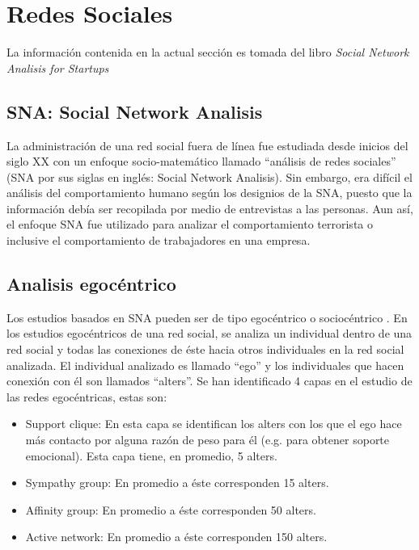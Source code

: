 \section{Redes Sociales} \label{sec:red}

La información contenida en la actual sección es tomada del libro \textit{Social Network Analisis for Startups} \cite{sna_startups}

\subsection{SNA: Social Network Analisis}

La administración de una red social fuera de línea fue estudiada desde inicios del siglo XX \cite{dynamics} con un enfoque socio-matemático llamado “análisis de redes sociales” (SNA por sus siglas en inglés: Social Network Analisis). Sin embargo, era difícil el análisis del comportamiento humano según los designios de la SNA, puesto que la información debía ser recopilada por medio de entrevistas a las personas. Aun así, el enfoque SNA fue utilizado para analizar el comportamiento terrorista o inclusive el comportamiento de trabajadores en una empresa. \cite{sna_startups}

\subsection{Analisis egocéntrico} \label{sec:egocentrico}

Los estudios basados en SNA pueden ser de tipo egocéntrico o sociocéntrico \cite{user_behavior}. En los estudios egocéntricos de una red social, se analiza un individual dentro de una red social y todas las conexiones de éste hacia otros individuales en la red social analizada. El individual analizado es llamado “ego” y los individuales que hacen conexión con él son llamados “alters”. Se han identificado 4 capas en el estudio de las redes egocéntricas, estas son:

\begin{itemize}
  \item Support clique: En esta capa se identifican los alters con los que el ego hace más contacto por alguna razón de peso para él (e.g. para obtener soporte emocional). Esta capa tiene, en promedio, 5 alters.
  \item Sympathy group: En promedio a éste corresponden 15 alters.
  \item Affinity group: En promedio a éste corresponden 50 alters.
  \item Active network: En promedio a éste corresponden 150 alters.
\end{itemize}

